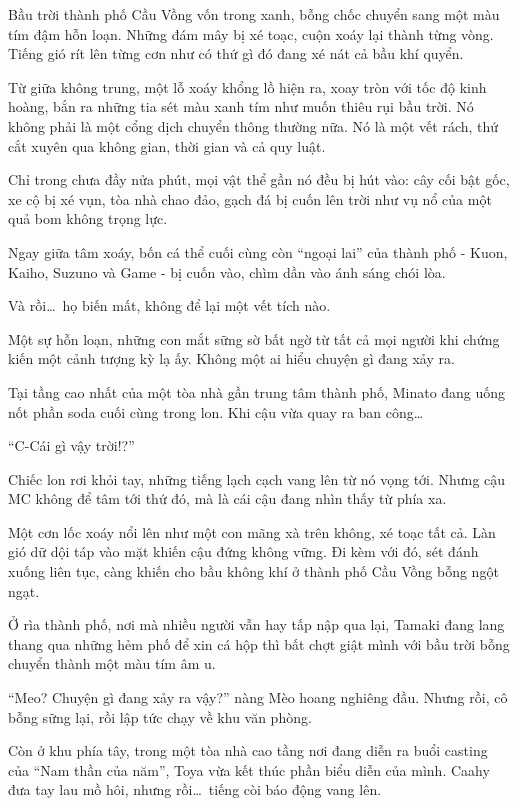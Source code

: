 \documentclass[../main.tex]{subfiles}
\begin{document}
Bầu trời thành phố Cầu Vồng vốn trong xanh, bỗng chốc chuyển sang một màu tím đậm hỗn loạn. Những đám mây bị xé toạc, cuộn xoáy lại thành từng vòng. Tiếng gió rít lên từng cơn như có thứ gì đó đang xé nát cả bầu khí quyển.

Từ giữa không trung, một lỗ xoáy khổng lồ hiện ra, xoay tròn với tốc độ kinh hoàng, bắn ra những tia sét màu xanh tím như muốn thiêu rụi bầu trời. Nó không phải là một cổng dịch chuyển thông thường nữa. Nó là một vết rách, thứ cắt xuyên qua không gian, thời gian và cả quy luật.

Chỉ trong chưa đầy nửa phút, mọi vật thể gần nó đều bị hút vào: cây cối bật gốc, xe cộ bị xé vụn, tòa nhà chao đảo, gạch đá bị cuốn lên trời như vụ nổ của một quả bom không trọng lực.

Ngay giữa tâm xoáy, bốn cá thể cuối cùng còn ``ngoại lai'' của thành phố - Kuon, Kaiho, Suzuno và Game - bị cuốn vào, chìm dần vào ánh sáng chói lòa.

Và rồi\dots\ họ biến mất, không để lại một vết tích nào.

Một sự hỗn loạn, những con mắt sững sờ bất ngờ từ tất cả mọi người khi chứng kiến một cảnh tượng kỳ lạ ấy. Không một ai hiểu chuyện gì đang xảy ra.

Tại tầng cao nhất của một tòa nhà gần trung tâm thành phố, Minato đang uống nốt phần soda cuối cùng trong lon. Khi cậu vừa quay ra ban công\dots

``C-Cái gì vậy trời!?''

Chiếc lon rơi khỏi tay, những tiếng lạch cạch vang lên từ nó vọng tới. Nhưng cậu MC không để tâm tới thứ đó, mà là cái cậu đang nhìn thấy từ phía xa.

Một cơn lốc xoáy nổi lên như một con mãng xà trên không, xé toạc tất cả. Làn gió dữ dội táp vào mặt khiến cậu đứng không vững. Đi kèm với đó, sét đánh xuống liên tục, càng khiến cho bầu không khí ở thành phố Cầu Vồng bỗng ngột ngạt.

Ở rìa thành phố, nơi mà nhiều người vẫn hay tấp nập qua lại, Tamaki đang lang thang qua những hẻm phố để xin cá hộp thì bất chợt giật mình với bầu trời bỗng chuyển thành một màu tím âm u.

``Meo? Chuyện gì đang xảy ra vậy?'' nàng Mèo hoang nghiêng đầu. Nhưng rồi, cô bỗng sững lại, rồi lập tức chạy về khu văn phòng.

Còn ở khu phía tây, trong một tòa nhà cao tầng nơi đang diễn ra buổi casting của ``Nam thần của năm'', Toya vừa kết thúc phần biểu diễn của mình. Caahy đưa tay lau mồ hôi, nhưng rồi\dots\ tiếng còi báo động vang lên.
\end{document}
